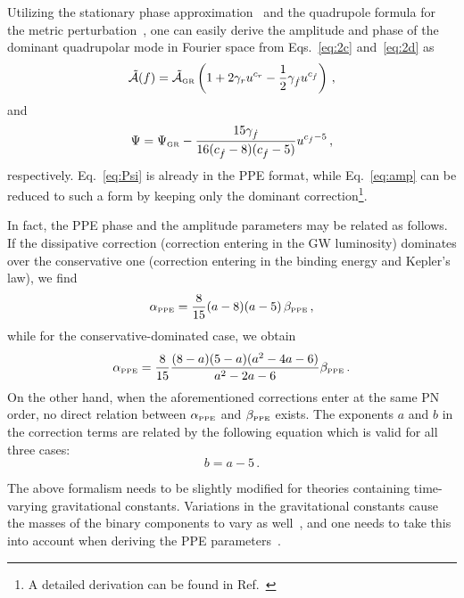 \documentclass[prd,twocolumn,nofootinbib]{revtex4-1}
\newcommand\be{\begin{equation}}
\newcommand\ee{\end{equation}}
\newcommand{\PPE}{{\mbox{\tiny PPE}}}
\newcommand{\GR}{{\mbox{\tiny GR}}}
\begin{document}
Utilizing the stationary phase approximation~\cite{PhysRevD.62.084036,Yunes:2009yz} and the quadrupole formula for the metric perturbation~\cite{Blanchet:2002av}, one can easily derive the amplitude and phase of the dominant quadrupolar mode in Fourier space from Eqs.~\eqref{eq:2c} and~\eqref{eq:2d} as
\begin{equation}\label{eq:amp}
\tilde{\mathcal{A}}(f)=\tilde{\mathcal{A}}_{\GR} \left(1+2\gamma_ru^{c_r}-\frac{1}{2}\gamma_{\dot{f}}u^{c_{\dot{f}}}\right)\,,
\end{equation}
and
\be
\label{eq:Psi}
\Psi = \Psi_\GR  -\frac{15 \text{$\gamma_{\dot{f}} $}}{16 (\text{$c_{\dot{f}}$}-8) (\text{$c_{\dot{f}}$}-5)} u^{c_{\dot{f}}-5}\,,
\ee
respectively. Eq.~\eqref{eq:Psi} is already in the PPE format, while  Eq.~\eqref{eq:amp} can be reduced to such a form by keeping only the dominant correction\footnote{A detailed derivation can be found in Ref.~\cite{Tahura:2018zuq}}.

In fact, the PPE phase and the amplitude parameters may be related as follows. If the dissipative correction (correction entering in the GW luminosity) dominates over the conservative one (correction entering in the binding energy and Kepler's law), we find
\begin{equation}\label{eq:2w2}
\alpha_{\PPE} = \frac{8}{15} (a-8)(a-5) \, \beta_{\PPE}\,,
\end{equation}
while for the conservative-dominated case, we obtain
\begin{equation}\label{eq:2w3}
\alpha_{\PPE} =\frac{8}{15} \frac{(8-a)(5-a)(a^2-4a-6)}{a^2-2a-6} \beta_{\PPE}\,.
\end{equation}
On the other hand, when the aforementioned corrections enter at the same PN order, no direct relation between $\alpha_{\PPE}$ and $\beta_{\PPE}$ exists. The exponents $a$ and $b$ in the correction terms are related by the following equation which is valid for all three cases:
\begin{equation}
b=a-5\,.
\end{equation}


The above formalism needs to be slightly modified for theories containing time-varying gravitational constants. Variations in the gravitational constants cause the masses  of the binary components to vary as well~\cite{PhysRevLett.65.953}, and one needs to take this into account when deriving the PPE parameters~\cite{Tahura:2018zuq}.
\end{document}
